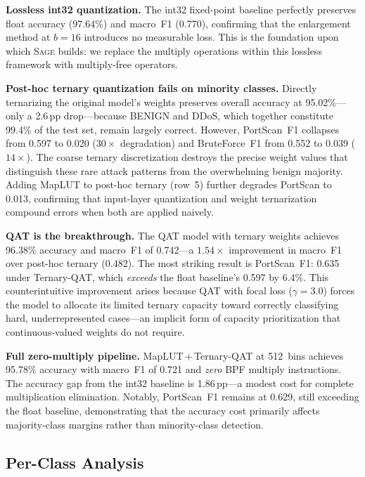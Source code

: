\documentclass[sigconf,nonacm]{acmart}
\newcommand{\sys}{\textsc{Sage}\xspace}
\begin{document}
\textbf{Lossless int32 quantization.}
The int32 fixed-point baseline perfectly preserves float accuracy
(97.64\%) and macro~F1 (0.770), confirming that the enlargement method
at $b = 16$ introduces no measurable loss.
This is the foundation upon which \sys builds: we replace the multiply
operations within this lossless framework with multiply-free operators.

\textbf{Post-hoc ternary quantization fails on minority classes.}
Directly ternarizing the original model's weights preserves overall
accuracy at 95.02\%---only a 2.6\,pp drop---because BENIGN and DDoS,
which together constitute 99.4\% of the test set, remain largely
correct.
However, PortScan~F1 collapses from 0.597 to 0.020 ($30\times$
degradation) and BruteForce~F1 from 0.552 to 0.039 ($14\times$).
The coarse ternary discretization destroys the precise weight values
that distinguish these rare attack patterns from the overwhelming
benign majority.
Adding MapLUT to post-hoc ternary (row~5) further degrades PortScan to
0.013, confirming that input-layer quantization and weight ternarization
compound errors when both are applied naively.

\textbf{QAT is the breakthrough.}
The QAT model with ternary weights achieves 96.38\% accuracy and
macro~F1 of 0.742---a $1.54\times$ improvement in macro~F1 over
post-hoc ternary (0.482).
The most striking result is PortScan~F1: 0.635 under Ternary-QAT,
which \emph{exceeds} the float baseline's 0.597 by 6.4\%.
This counterintuitive improvement arises because QAT with focal loss
($\gamma = 3.0$) forces the model to allocate its limited ternary
capacity toward correctly classifying hard, underrepresented cases---an
implicit form of capacity prioritization that continuous-valued weights
do not require.

\textbf{Full zero-multiply pipeline.}
MapLUT\,+\,Ternary-QAT at 512~bins achieves 95.78\% accuracy with
macro~F1 of 0.721 and \emph{zero} BPF multiply instructions.
The accuracy gap from the int32 baseline is 1.86\,pp---a modest cost
for complete multiplication elimination.
Notably, PortScan~F1 remains at 0.629, still exceeding the float
baseline, demonstrating that the accuracy cost primarily affects
majority-class margins rather than minority-class detection.

\subsection{Per-Class Analysis}\label{sec:perclass}
\end{document}
